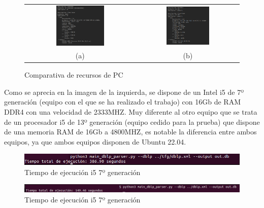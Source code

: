 \documentclass[a4paper, 12pt]{book}
\begin{document}
\begin{figure}[h]
    \centering
    \begin{tabular}{cc}
    \includegraphics[width=0.46\textwidth]{img/pc_s.png} &  
    \includegraphics[width=0.44\textwidth]{img/pc_b.png} \\
    (a) &(b)
    \end{tabular}
    \caption{Comparativa de recursos de PC}
    \label{fig:comparativa_pc}
\end{figure}

Como se aprecia en la imagen de la izquierda, se dispone de un Intel i5 de 7º generación (equipo con el que se ha realizado el trabajo) con 16Gb de RAM DDR4 con una velocidad de 2333MHZ. Muy diferente al otro equipo que se trata de un procesador i5 de 13º generación (equipo cedido para la prueba) que dispone de una memoria RAM de 16Gb a 4800MHZ, es notable la diferencia entre ambos equipos, ya que ambos equipos disponen de Ubuntu 22.04.

\begin{figure}[h]
  \centering
  \includegraphics[width=16cm, keepaspectratio]{img/ej_time_i5_7a.png}
  \caption{Tiempo de ejecución i5 7º generación}
  \label{fig:time_s}
\end{figure}
\begin{figure}[h]
  \centering
  \includegraphics[width=16cm, keepaspectratio]{img/ej_time_i5_13a.png}
  \caption{Tiempo de ejecución i5 7º generación}
  \label{fig:time_b}
\end{figure}
\end{document}
